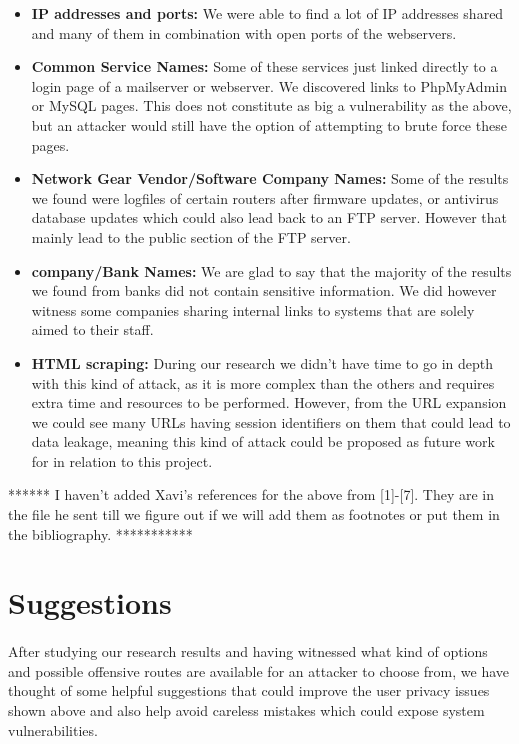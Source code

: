 \documentclass[12pt]{article}
\begin{document}
\begin{itemize}
\item \textbf{IP addresses and ports:}  We were able to find a lot of IP addresses shared and many of them in combination with open ports of the webservers.

\item \textbf{Common Service Names:} Some of these services just linked directly to a login page of a mailserver or webserver. We discovered links to PhpMyAdmin or MySQL pages. This does not constitute as big a vulnerability as the above, but an attacker would still have the option of attempting to brute force these pages.

\item \textbf{Network Gear Vendor/Software Company Names:} Some of the results we found were logfiles of certain routers after firmware updates, or antivirus database updates which could also lead back to an FTP server. However that mainly lead to the public section of the FTP server.

\item \textbf{company/Bank Names:} We are glad to say that the majority of the results we found from banks did not contain sensitive information. We did however witness some companies sharing internal links to systems that are solely aimed to their staff.

\item \textbf{HTML scraping:} During our research we didn't have time to go in depth with this kind of attack, as it is more complex than the others and requires extra time and resources to be performed. However, from the URL expansion we could see many URLs having session identifiers on them that could lead to data leakage, meaning this kind of attack could be proposed as future work for in relation to this project.

\end{itemize}

****** I haven't added Xavi's references for the above from [1]-[7]. They are in the file he sent till we figure out if we will add them as footnotes or put them in the bibliography. ***********
\newpage
\section{Suggestions}

\paragraph{}
 After studying our research results and having witnessed what kind of options and possible offensive routes are available for an attacker to choose from, we have thought of some helpful suggestions that could improve the user privacy issues shown above and also help avoid careless mistakes which could expose system vulnerabilities.
\end{document}
